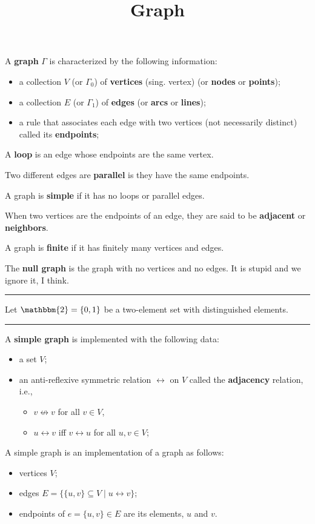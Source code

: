 \documentclass[12pt]{article}
\title{Graph \\
    \large 
}
\author{}
\date{}
\newcommand{\keyword}[1]{\textbf{#1}}
\newcommand{\sepline}{\rule{\textwidth}{0.4pt}}
\theoremstyle{definition}
\newcommand{\<}{\left\langle}
\renewcommand{\>}{\right\rangle}
\newcommand{\seq}{\subseteq}
\newcommand{\adj}{\leftrightarrow}
\begin{document}
A \keyword{graph} $\Gamma$ is characterized by the following information:
\begin{itemize}
    \item a collection $V$ (or $\Gamma_0$) of \keyword{vertices} (sing. vertex) (or \keyword{nodes} or \keyword{points});
    \item a collection $E$ (or $\Gamma_1$) of \keyword{edges} (or \keyword{arcs} or \keyword{lines});
    \item a rule that associates each edge with two vertices (not necessarily distinct) called its \keyword{endpoints};
\end{itemize}

A \keyword{loop} is an edge whose endpoints are the same vertex.

Two different edges are \keyword{parallel} is they have the same endpoints.

A graph is \keyword{simple} if it has no loops or parallel edges.

When two vertices are the endpoints of an edge, they are said to be \keyword{adjacent} or \keyword{neighbors}.

A graph is \keyword{finite} if it has finitely many vertices and edges.

The \keyword{null graph} is the graph with no vertices and no edges.
It is stupid and we ignore it, I think.

\sepline

Let $\mathbbm{2} = \{0, 1\}$ be a two-element set with distinguished elements.

\sepline

A \keyword{simple graph} is implemented with the following data:
\begin{itemize}
    \item a set $V$;
    \item an anti-reflexive symmetric relation $\adj$ on $V$ called the \keyword{adjacency} relation, i.e.,
    \begin{itemize}
        \item $v \not\adj v$ for all $v \in V$,
        \item $u \adj v$ iff $v \adj u$ for all $u, v \in V$;
    \end{itemize}
\end{itemize}

A simple graph is an implementation of a graph as follows:
\begin{itemize}
    \item vertices $V$;
    \item edges $E = \{\{u, v\} \seq V \mid u \adj v\}$;
    \item endpoints of $e = \{u, v\} \in E$ are its elements, $u$ and $v$.
\end{itemize}
\end{document}
